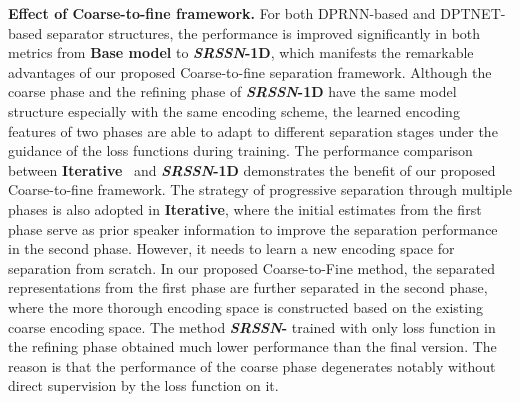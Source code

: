 \smallskip\noindent\textbf{Effect of Coarse-to-fine framework.}
For both DPRNN-based and DPTNET-based separator structures, the performance is improved significantly in both metrics from \textbf{Base model} to \textbf{\emph{SRSSN}-1D}, which manifests the remarkable advantages of our proposed Coarse-to-fine separation framework. Although the coarse phase and the refining phase of \textbf{\emph{SRSSN}-1D} have the same model structure especially with the same encoding scheme, the learned encoding features of two phases are able to adapt to different separation stages under the guidance of the loss functions during training. The performance comparison between \textbf{Iterative}~\cite{universal, improving} and \textbf{\emph{SRSSN}-1D} demonstrates the benefit of our proposed Coarse-to-fine framework. The strategy of progressive separation through multiple phases is also adopted in \textbf{Iterative}, where the initial estimates from the first phase serve as prior speaker information to improve the separation performance in the second phase. However, it needs to learn a new encoding space for separation from scratch. In our proposed Coarse-to-Fine method, the separated representations from the first phase are further separated in the second phase, where the more thorough encoding space is constructed based on the existing coarse encoding space.
The method \textbf{\emph{SRSSN}-} trained with only loss function in the refining phase obtained much lower performance than the final version. The reason is that the performance of the coarse phase degenerates notably without direct supervision by the loss function on it.





